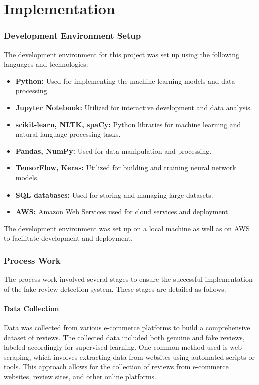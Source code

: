 \chapter{Implementation}
\subsection{Development Environment Setup}
The development environment for this project was set up using the following languages and technologies:
\begin{itemize}
    \item \textbf{Python:} Used for implementing the machine learning models and data processing.
    \item \textbf{Jupyter Notebook:} Utilized for interactive development and data analysis.
    \item \textbf{scikit-learn, NLTK, spaCy:} Python libraries for machine learning and natural language processing tasks.
    \item \textbf{Pandas, NumPy:} Used for data manipulation and processing.
    \item \textbf{TensorFlow, Keras:} Utilized for building and training neural network models.
    \item \textbf{SQL databases:} Used for storing and managing large datasets.
    \item \textbf{AWS:} Amazon Web Services used for cloud services and deployment.
\end{itemize}

The development environment was set up on a local machine as well as on AWS to facilitate development and deployment.

\subsection{Process Work}
The process work involved several stages to ensure the successful implementation of the fake review detection system. These stages are detailed as follows:

\subsubsection{Data Collection}
Data was collected from various e-commerce platforms to build a comprehensive dataset of reviews. The collected data included both genuine and fake reviews, labeled accordingly for supervised learning.
One common method used is web scraping, which involves extracting data from websites using automated scripts or tools. This approach allows for the collection of reviews from e-commerce websites, review sites, and other online platforms. 

